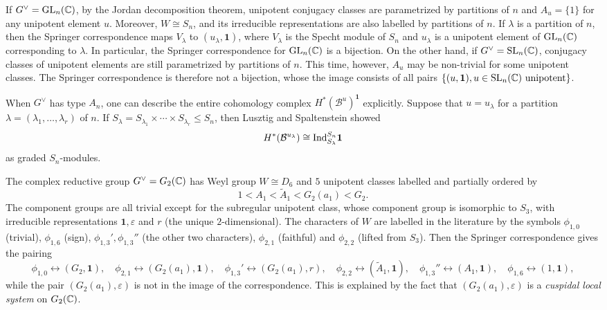\begin{example}
    If $G^\vee=\mathrm{GL}_n(\mathbb{C})$, by the Jordan decomposition theorem, unipotent conjugacy classes are parametrized by partitions of $n$ and $A_u=\{1\}$ for any unipotent element $u$. Moreover, $W\cong S_n$, and its irreducible representations are also labelled by partitions of $n$. If $\lambda$ is a partition of $n$, then the Springer correspondence maps $V_\lambda$ to $(u_\lambda,\mathbf{1})$, where $V_\lambda$ is the Specht module of $S_n$ and $u_\lambda$ is a unipotent element of $\mathrm{GL}_n(\mathbb{C})$ corresponding to $\lambda$. In particular, the Springer correspondence for $\mathrm{GL}_n(\mathbb{C})$ is a bijection. On the other hand, if $G^\vee=\mathrm{SL}_n(\mathbb{C})$, conjugacy classes of unipotent elements are still parametrized by partitions of $n$. This time, however, $A_u$ may be non-trivial for some unipotent classes. The Springer correspondence is therefore not a bijection, whose the image consists of all pairs $\{(u,\mathbf{1}), u\in\mathrm{SL}_n(\mathbb{C})\textrm{ unipotent}\}$.

    When $G^\vee$ has type $A_n$, one can describe the entire cohomology complex $H^*(\mathcal{B}^u)^\mathbf{1}$ explicitly. Suppose that $u=u_\lambda$ for a partition $\lambda=(\lambda_1,\ldots,\lambda_r)$ of $n$. If $S_\lambda=S_{\lambda_1}\times\cdots\times S_{\lambda_r}\leq S_n$, then Lusztig and Spaltenstein showed
    $$H^*(\mathcal{B}^{u_\lambda})\cong\mathrm{Ind}_{S_\lambda}^{S_n}\mathbf{1}$$
    as graded $S_n$-modules.
\end{example}

\begin{example}
    The complex reductive group $G^\vee=G_2(\mathbb{C})$ has Weyl group $W\cong D_6$ and $5$ unipotent classes labelled and partially ordered by 
    $$1<A_1<\tilde{A}_1<G_2(a_1)<G_2.$$
    The component groups are all trivial except for the subregular unipotent class, whose component group is isomorphic to $S_3$, with irreducible representations $\mathbf{1},\varepsilon$ and $r$ (the unique $2$-dimensional).
    The characters of $W$ are labelled in the literature by the symbols $\phi_{1,0}$ (trivial), $\phi_{1,6}$ (sign), $\phi_{1,3}',\phi_{1,3}''$ (the other two characters), $\phi_{2,1}$ (faithful) and $\phi_{2,2}$ (lifted from $S_3$). Then the Springer correspondence gives the pairing 
    $$\phi_{1,0}\leftrightarrow(G_2,\mathbf{1}),\quad\phi_{2,1}\leftrightarrow(G_2(a_1),\mathbf{1}),\quad\phi_{1,3}'\leftrightarrow(G_2(a_1),r),\quad\phi_{2,2}\leftrightarrow(\tilde{A}_1,\mathbf{1}),\quad\phi_{1,3}''\leftrightarrow(A_1,\mathbf{1}),\quad\phi_{1,6}\leftrightarrow(1,\mathbf{1}),$$
    while the pair $(G_2(a_1),\varepsilon)$ is not in the image of the correspondence. This is explained by the fact that $(G_2(a_1),\varepsilon)$ is a \textit{cuspidal local system} on $G_2(\mathbb{C})$.
\end{example}

